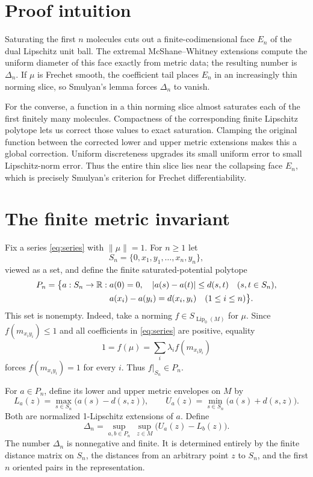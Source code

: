 \documentclass[11pt]{article}
\newcommand{\Lip}{\operatorname{Lip}_0}
\newcommand{\R}{\mathbb R}
\begin{document}
\FloatBarrier
\section{Proof intuition}

Saturating the first $n$ molecules cuts out a finite-codimensional face
$E_n$ of the dual Lipschitz unit ball. The extremal McShane--Whitney
extensions compute the uniform diameter of this face exactly from metric
data; the resulting number is $\Delta_n$. If $\mu$ is Frechet smooth, the
coefficient tail places $E_n$ in an increasingly thin norming slice, so
Smulyan's lemma forces $\Delta_n$ to vanish.

For the converse, a function in a thin norming slice almost saturates each of
the first finitely many molecules. Compactness of the corresponding finite
Lipschitz polytope lets us correct those values to exact saturation.
Clamping the original function between the corrected lower and upper metric
extensions makes this a global correction. Uniform discreteness upgrades its
small uniform error to small Lipschitz-norm error. Thus the entire thin slice
lies near the collapsing face $E_n$, which is precisely Smulyan's criterion
for Frechet differentiability.

\section{The finite metric invariant}

Fix a series \eqref{eq:series} with $\|\mu\|=1$. For $n\geq1$ let
\[
 S_n=\{0,x_1,y_1,\ldots,x_n,y_n\},
\]
viewed as a set, and define the finite saturated-potential polytope
\begin{align}
 P_n=\bigl\{a:S_n\to\R:\;&a(0)=0,
 \quad |a(s)-a(t)|\leq d(s,t)\quad(s,t\in S_n),\notag\\
 &a(x_i)-a(y_i)=d(x_i,y_i)\quad(1\leq i\leq n)\bigr\}.
 \label{eq:Pn}
\end{align}
This set is nonempty. Indeed, take a norming $f\in S_{\Lip(M)}$ for $\mu$.
Since $f(m_{x_i y_i})\leq1$ and all coefficients in \eqref{eq:series} are
positive, equality
\[
 1=f(\mu)=\sum_i\lambda_i f(m_{x_i y_i})
\]
forces $f(m_{x_i y_i})=1$ for every $i$. Thus $f|_{S_n}\in P_n$.

For $a\in P_n$, define its lower and upper metric envelopes on $M$ by
\begin{equation}
 L_a(z)=\max_{s\in S_n}\bigl(a(s)-d(s,z)\bigr),
 \qquad
 U_a(z)=\min_{s\in S_n}\bigl(a(s)+d(s,z)\bigr).
 \label{eq:envelopes}
\end{equation}
Both are normalized 1-Lipschitz extensions of $a$. Define
\begin{equation}
 \boxed{\quad
 \Delta_n=\sup_{a,b\in P_n}\ \sup_{z\in M}
             \bigl(U_a(z)-L_b(z)\bigr).
 \quad}
 \label{eq:Delta}
\end{equation}
The number $\Delta_n$ is nonnegative and finite. It is determined entirely by
the finite distance matrix on $S_n$, the distances from an arbitrary point
$z$ to $S_n$, and the first $n$ oriented pairs in the representation.
\end{document}
